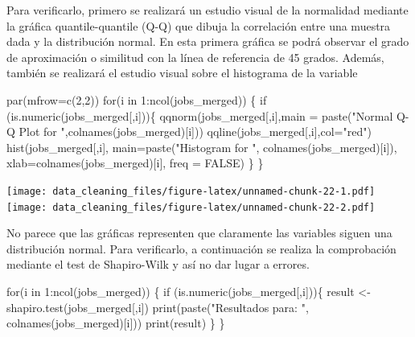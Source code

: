 \documentclass[
]{article}
\newenvironment{Shaded}{\begin{snugshade}}{\end{snugshade}}
\newcommand{\ControlFlowTok}[1]{\textcolor[rgb]{0.94,0.87,0.69}{#1}}
\newcommand{\DataTypeTok}[1]{\textcolor[rgb]{0.87,0.87,0.75}{#1}}
\newcommand{\DecValTok}[1]{\textcolor[rgb]{0.86,0.86,0.80}{#1}}
\newcommand{\KeywordTok}[1]{\textcolor[rgb]{0.94,0.87,0.69}{#1}}
\newcommand{\NormalTok}[1]{\textcolor[rgb]{0.80,0.80,0.80}{#1}}
\newcommand{\OperatorTok}[1]{\textcolor[rgb]{0.94,0.94,0.82}{#1}}
\newcommand{\OtherTok}[1]{\textcolor[rgb]{0.94,0.94,0.56}{#1}}
\newcommand{\StringTok}[1]{\textcolor[rgb]{0.80,0.58,0.58}{#1}}
\begin{document}
Para verificarlo, primero se realizará un estudio visual de la
normalidad mediante la gráfica quantile-quantile (Q-Q) que dibuja la
correlación entre una muestra dada y la distribución normal. En esta
primera gráfica se podrá observar el grado de aproximación o similitud
con la línea de referencia de 45 grados. Además, también se realizará el
estudio visual sobre el histograma de la variable

\begin{Shaded}
\begin{Highlighting}[]
\KeywordTok{par}\NormalTok{(}\DataTypeTok{mfrow=}\KeywordTok{c}\NormalTok{(}\DecValTok{2}\NormalTok{,}\DecValTok{2}\NormalTok{))}
\ControlFlowTok{for}\NormalTok{(i }\ControlFlowTok{in} \DecValTok{1}\OperatorTok{:}\KeywordTok{ncol}\NormalTok{(jobs\_merged)) \{}
  \ControlFlowTok{if}\NormalTok{ (}\KeywordTok{is.numeric}\NormalTok{(jobs\_merged[,i]))\{}
    \KeywordTok{qqnorm}\NormalTok{(jobs\_merged[,i],}\DataTypeTok{main =} \KeywordTok{paste}\NormalTok{(}\StringTok{"Normal Q{-}Q Plot for "}\NormalTok{,}\KeywordTok{colnames}\NormalTok{(jobs\_merged)[i]))}
    \KeywordTok{qqline}\NormalTok{(jobs\_merged[,i],}\DataTypeTok{col=}\StringTok{"red"}\NormalTok{)}
    \KeywordTok{hist}\NormalTok{(jobs\_merged[,i],}
      \DataTypeTok{main=}\KeywordTok{paste}\NormalTok{(}\StringTok{"Histogram for "}\NormalTok{, }\KeywordTok{colnames}\NormalTok{(jobs\_merged)[i]),}
      \DataTypeTok{xlab=}\KeywordTok{colnames}\NormalTok{(jobs\_merged)[i], }\DataTypeTok{freq =} \OtherTok{FALSE}\NormalTok{)}
\NormalTok{  \}}
\NormalTok{\}}
\end{Highlighting}
\end{Shaded}

\texttt{[image: data\_cleaning\_files/figure-latex/unnamed-chunk-22-1.pdf]}
\texttt{[image: data\_cleaning\_files/figure-latex/unnamed-chunk-22-2.pdf]}

No parece que las gráficas representen que claramente las variables
siguen una distribución normal. Para verificarlo, a continuación se
realiza la comprobación mediante el test de Shapiro-Wilk y así no dar
lugar a errores.

\begin{Shaded}
\begin{Highlighting}[]
\ControlFlowTok{for}\NormalTok{(i }\ControlFlowTok{in} \DecValTok{1}\OperatorTok{:}\KeywordTok{ncol}\NormalTok{(jobs\_merged)) \{}
  \ControlFlowTok{if}\NormalTok{ (}\KeywordTok{is.numeric}\NormalTok{(jobs\_merged[,i]))\{}
\NormalTok{    result \textless{}{-}}\StringTok{ }\KeywordTok{shapiro.test}\NormalTok{(jobs\_merged[,i])}
    \KeywordTok{print}\NormalTok{(}\KeywordTok{paste}\NormalTok{(}\StringTok{"Resultados para: "}\NormalTok{, }\KeywordTok{colnames}\NormalTok{(jobs\_merged)[i]))}
    \KeywordTok{print}\NormalTok{(result)}
\NormalTok{  \}}
\NormalTok{\}}
\end{Highlighting}
\end{Shaded}
\end{document}

